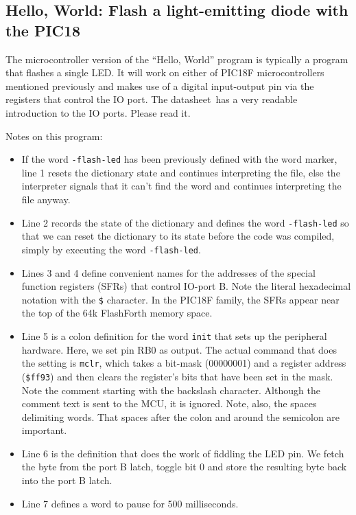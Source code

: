\documentclass[12pt,a4paper]{article}
\newcommand{\code}[2]{
 \hrulefill
 \scriptsize
 
 \hrulefill
 \vspace{2em}
 \normalsize
}
\begin{document}
\subsection{Hello, World: Flash a light-emitting diode with the PIC18}
%
The microcontroller version of the ``Hello, World'' program is typically a program that
flashes a single LED.
It will work on either of PIC18F microcontrollers mentioned previously and 
makes use of a digital input-output pin via the registers that control the IO port.
The datasheet\,\cite{pic18f26k22-datasheet} has a very readable introduction 
to the IO ports.
Please read it.

\bigskip\noindent
\code{}{../pic18/flash-led-pic18.txt}

\medskip\noindent
Notes on this program:
\begin{itemize}
 \item If the word \verb!-flash-led! has been previously defined with the word marker, 
  line 1 resets the dictionary state and continues interpreting the file, 
  else the interpreter signals that it can't find the word and continues interpreting the file anyway.
 \item Line 2 records the state of the dictionary and defines the word \verb!-flash-led!
  so that we can reset the dictionary to its state before the code was compiled, 
  simply by executing the word \verb!-flash-led!.
 \item Lines 3 and 4 define convenient names for the addresses of 
  the special function registers (SFRs) that control IO-port B.
  Note the literal hexadecimal notation with the \verb!$! character.
  In the PIC18F family, the SFRs appear near the top of the 64k FlashForth memory space.
 \item Line 5 is a colon definition for the word \verb!init! that sets up the peripheral
  hardware.  
  Here, we set pin RB0 as output.
  The actual command that does the setting is \verb!mclr!,
  which takes a bit-mask (00000001) and a register address (\verb!$ff93!)
  and then clears the register's bits that have been set in the mask.
  Note the comment starting with the backslash character. 
  Although the comment text is sent to the MCU, it is ignored.
  Note, also, the spaces delimiting words.  That spaces after the colon and
  around the semicolon are important.
 \item Line 6 is the definition that does the work of fiddling the LED pin.
  We fetch the byte from the port B latch, toggle bit 0 and 
  store the resulting byte back into the port B latch.
 \item Line 7 defines a word to pause for 500 milliseconds.

\end{itemize}
\end{document}
